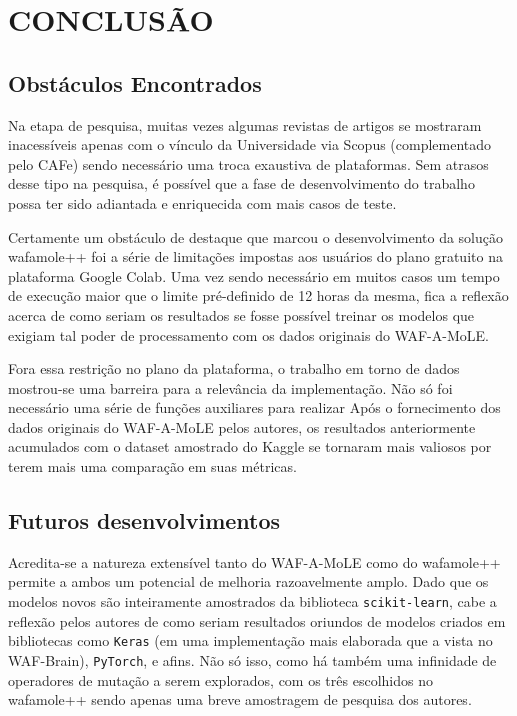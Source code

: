 \chapter{CONCLUSÃO}
\label{chp:capitulo6}

\section{Obstáculos Encontrados}

Na etapa de pesquisa, muitas vezes algumas revistas de artigos se mostraram inacessíveis apenas com o vínculo da Universidade via Scopus (complementado pelo CAFe) sendo necessário uma troca exaustiva de plataformas. Sem atrasos desse tipo na pesquisa, é possível que a fase de desenvolvimento do trabalho possa ter sido adiantada e enriquecida com mais casos de teste.

Certamente um obstáculo de destaque que marcou o desenvolvimento da solução wafamole++ foi a série de limitações impostas aos usuários do plano gratuito na plataforma Google Colab. Uma vez sendo necessário em muitos casos um tempo de execução maior que o limite pré-definido de 12 horas da mesma, fica a reflexão acerca de como seriam os resultados se fosse possível treinar os modelos que exigiam tal poder de processamento com os dados originais do WAF-A-MoLE.

Fora essa restrição no plano da plataforma, o trabalho em torno de dados mostrou-se uma barreira para a relevância da implementação. Não só foi necessário uma série de funções auxiliares para realizar Após o fornecimento dos dados originais do WAF-A-MoLE pelos autores, os resultados anteriormente acumulados com o dataset amostrado do Kaggle se tornaram mais valiosos por terem mais uma comparação em suas métricas.

\section{Futuros desenvolvimentos}
Acredita-se a natureza extensível tanto do WAF-A-MoLE como do wafamole++ permite a ambos um potencial de melhoria razoavelmente amplo. Dado que os modelos novos são inteiramente amostrados da biblioteca \verb+scikit-learn+, cabe a reflexão pelos autores de como seriam resultados oriundos de modelos criados em bibliotecas como \verb+Keras+ (em uma implementação mais elaborada que a vista no WAF-Brain), \verb+PyTorch+, e afins. Não só isso, como há também uma infinidade de operadores de mutação a serem explorados, com os três escolhidos no wafamole++ sendo apenas uma breve amostragem de pesquisa dos autores.

